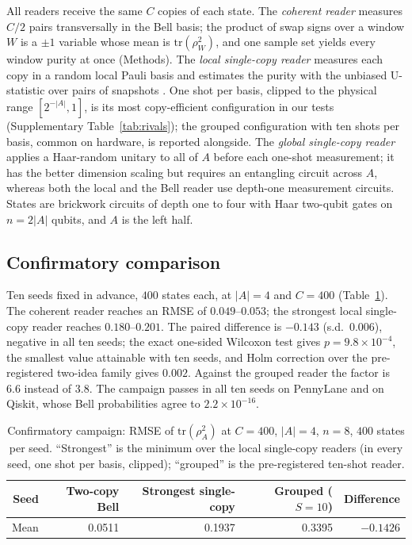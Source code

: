 \documentclass[11pt,a4paper]{article}
\begin{document}
All readers receive the same $C$ copies of each state. The \emph{coherent reader} measures $C/2$
pairs transversally in the Bell basis; the product of swap signs over a window $W$ is a $\pm1$
variable whose mean is $\mathrm{tr}(\rho_W^2)$, and one sample set yields every window purity at
once (Methods). The \emph{local single-copy reader} measures each copy in a random local Pauli
basis and estimates the purity with the unbiased U-statistic over pairs of snapshots
\citep{huang2020predicting,elben2022toolbox}. One shot per basis, clipped to the physical range
$[2^{-|A|},1]$, is its most copy-efficient configuration in our tests (Supplementary
Table~\ref{tab:rivals}); the grouped configuration with ten shots per basis, common on hardware, is
reported alongside. The \emph{global single-copy reader} applies a Haar-random unitary to all of $A$
before each one-shot measurement; it has the better dimension scaling but requires an entangling
circuit across $A$, whereas both the local and the Bell reader use depth-one measurement circuits.
States are brickwork circuits of depth one to four with Haar two-qubit gates on $n=2|A|$ qubits,
and $A$ is the left half.

\subsection{Confirmatory comparison}

Ten seeds fixed in advance, $400$ states each, at $|A|=4$ and $C=400$
(Table~\ref{tab:campaign}). The coherent reader reaches an RMSE of $0.049$--$0.053$; the strongest
local single-copy reader reaches $0.180$--$0.201$. The paired difference is $-0.143$ (s.d.\
$0.006$), negative in all ten seeds; the exact one-sided Wilcoxon test gives $p=9.8\times10^{-4}$,
the smallest value attainable with ten seeds, and Holm correction over the pre-registered two-idea
family gives $0.002$. Against the grouped reader the factor is $6.6$ instead of $3.8$. The
campaign passes in all ten seeds on PennyLane and on Qiskit, whose Bell probabilities agree to
$2.2\times10^{-16}$.

\begin{table}[H]
\centering
\small
\caption{Confirmatory campaign: RMSE of $\mathrm{tr}(\rho_A^2)$ at $C=400$, $|A|=4$, $n=8$,
$400$ states per seed. ``Strongest'' is the minimum over the local single-copy readers (in every
seed, one shot per basis, clipped); ``grouped'' is the pre-registered ten-shot reader.}
\label{tab:campaign}
\begin{tabular}{rrrrr}
\toprule
Seed & Two-copy Bell & Strongest single-copy & Grouped ($S=10$) & Difference \\
\midrule
\CampaignRows
\midrule
Mean & 0.0511 & 0.1937 & 0.3395 & $-0.1426$ \\
\bottomrule
\end{tabular}
\end{table}
\end{document}
